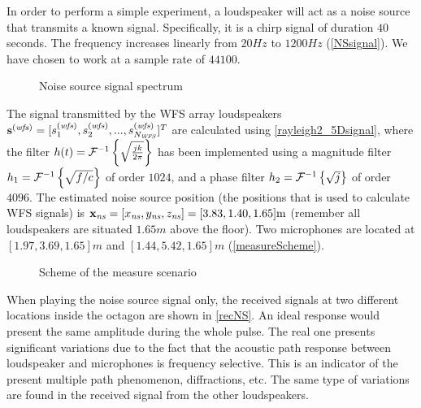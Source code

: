 In order to perform a simple experiment, a loudspeaker will act as a noise source that transmits a known signal. Specifically, it is a chirp signal of duration $40$ seconds. The frequency increases linearly from $20 \si{Hz}$ to $1200\si{Hz}$ (\autoref{NSsignal}). We have chosen to work at a sample rate of $44100$.
\begin{figure}[h]
	\centering
	\def\svgwidth{0.9\columnwidth}
	\graphicspath{{Img/}}
	{\fontsize{5}{12}\selectfont
		
	}
	\caption{Noise source signal spectrum}
	\label{NSsignal}
\end{figure}

The signal transmitted by the WFS array loudspeakers $\vec{\signal[wfs][time]} = [\signal[wfs][time]_1, \signal[wfs][time]_2, ..., \signal[wfs][time]_{\numWFS}]^T$ are calculated using \autoref{rayleigh2_5Dsignal}, where the filter $\freqFilter(t) = \FourierTransform{\sqrt{\frac{jk}{2\pi}}}[inverse]$ has been implemented using a magnitude filter $\freqFilter[time][magnitude] = \FourierTransform{\sqrt{f/c}}[inverse]$ of order $1024$, and a phase filter $\freqFilter[time][phase] = \FourierTransform{\sqrt{j}}[inverse]$ of order $4096$. The estimated noise source position (the positions that is used to calculate WFS signals) is $\Position[ns] = [\Position[ns][x], \Position[ns][y], \Position[ns][z]] = [3.83, 1.40, 1.65] \si{m}$ (remember all loudspeakers are situated $1.65\si{m}$ above the floor). Two microphones are located at $[1.97, 3.69, 1.65] \si{m}$ and $[1.44, 5.42, 1.65] \si{m}$ (\autoref{measureScheme}).

\begin{figure}[h]
	\centering
	\caption{Scheme of the measure scenario}
	\label{measureScheme}
\end{figure}

When playing the noise source signal only, the received signals at two different locations inside the octagon are shown in \autoref{recNS}. An ideal response would present the same amplitude during the whole pulse. The real one presents significant variations due to the fact that the acoustic path response between loudspeaker and microphones is frequency selective. This is an indicator of the present multiple path phenomenon, diffractions, etc. The same type of variations are found in the received signal from the other loudspeakers. %

